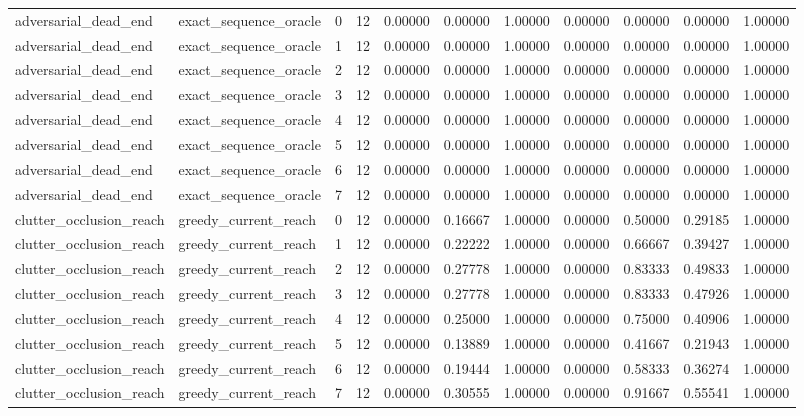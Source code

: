\documentclass{article}
\begin{document}
\begin{table}[tbp]
{\begin{tabular}{lllllllllll}
adversarial\_dead\_end & exact\_sequence\_oracle & 0 & 12 & 0.00000 & 0.00000 & 1.00000 & 0.00000 & 0.00000 & 0.00000 & 1.00000 \\
adversarial\_dead\_end & exact\_sequence\_oracle & 1 & 12 & 0.00000 & 0.00000 & 1.00000 & 0.00000 & 0.00000 & 0.00000 & 1.00000 \\
adversarial\_dead\_end & exact\_sequence\_oracle & 2 & 12 & 0.00000 & 0.00000 & 1.00000 & 0.00000 & 0.00000 & 0.00000 & 1.00000 \\
adversarial\_dead\_end & exact\_sequence\_oracle & 3 & 12 & 0.00000 & 0.00000 & 1.00000 & 0.00000 & 0.00000 & 0.00000 & 1.00000 \\
adversarial\_dead\_end & exact\_sequence\_oracle & 4 & 12 & 0.00000 & 0.00000 & 1.00000 & 0.00000 & 0.00000 & 0.00000 & 1.00000 \\
adversarial\_dead\_end & exact\_sequence\_oracle & 5 & 12 & 0.00000 & 0.00000 & 1.00000 & 0.00000 & 0.00000 & 0.00000 & 1.00000 \\
adversarial\_dead\_end & exact\_sequence\_oracle & 6 & 12 & 0.00000 & 0.00000 & 1.00000 & 0.00000 & 0.00000 & 0.00000 & 1.00000 \\
adversarial\_dead\_end & exact\_sequence\_oracle & 7 & 12 & 0.00000 & 0.00000 & 1.00000 & 0.00000 & 0.00000 & 0.00000 & 1.00000 \\
clutter\_occlusion\_reach & greedy\_current\_reach & 0 & 12 & 0.00000 & 0.16667 & 1.00000 & 0.00000 & 0.50000 & 0.29185 & 1.00000 \\
clutter\_occlusion\_reach & greedy\_current\_reach & 1 & 12 & 0.00000 & 0.22222 & 1.00000 & 0.00000 & 0.66667 & 0.39427 & 1.00000 \\
clutter\_occlusion\_reach & greedy\_current\_reach & 2 & 12 & 0.00000 & 0.27778 & 1.00000 & 0.00000 & 0.83333 & 0.49833 & 1.00000 \\
clutter\_occlusion\_reach & greedy\_current\_reach & 3 & 12 & 0.00000 & 0.27778 & 1.00000 & 0.00000 & 0.83333 & 0.47926 & 1.00000 \\
clutter\_occlusion\_reach & greedy\_current\_reach & 4 & 12 & 0.00000 & 0.25000 & 1.00000 & 0.00000 & 0.75000 & 0.40906 & 1.00000 \\
clutter\_occlusion\_reach & greedy\_current\_reach & 5 & 12 & 0.00000 & 0.13889 & 1.00000 & 0.00000 & 0.41667 & 0.21943 & 1.00000 \\
clutter\_occlusion\_reach & greedy\_current\_reach & 6 & 12 & 0.00000 & 0.19444 & 1.00000 & 0.00000 & 0.58333 & 0.36274 & 1.00000 \\
clutter\_occlusion\_reach & greedy\_current\_reach & 7 & 12 & 0.00000 & 0.30555 & 1.00000 & 0.00000 & 0.91667 & 0.55541 & 1.00000 \\

\end{tabular}}
\end{table}
\end{document}
